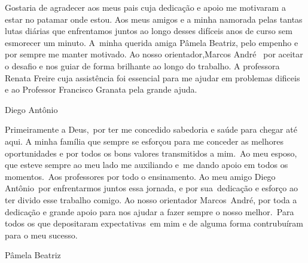 \documentclass[
    12pt,               %
    openright,          %
    oneside,            %
    a4paper,            %
    section=TITLE,     %
    english,            %
    french,             %
    spanish,            %
    brazil              %
    ]{abntex2}
\begin{document}
\hspace{.45\textwidth}
      \begin{minipage}{.5\textwidth}
Gostaria de agradecer aos meus pais cuja dedicação e apoio me motivaram a estar no patamar onde estou. Aos meus amigos e a minha namorada pelas tantas lutas diárias que enfrentamos juntos ao longo desses difíceis anos de curso sem esmorecer um minuto. A~minha querida amiga Pâmela Beatriz, pelo empenho e por sempre me manter motivado. Ao nosso orientador,Marcos André~ por aceitar o desafio e nos guiar de forma brilhante ao longo do trabalho. A professora Renata Freire cuja assistência foi essencial para me ajudar em problemas dificeis e ao Professor Francisco Granata pela grande ajuda.
\end{minipage}


\begin{flushright}
Diego Antônio
\end{flushright}


\hspace{.45\textwidth}
      \begin{minipage}{.5\textwidth}
Primeiramente a Deus,~por ter me concedido sabedoria e saúde para chegar até aqui. A minha família que sempre se esforçou para me conceder as melhores oportunidades e por todos os bons valores transmitidos a mim.~Ao meu esposo, que esteve sempre ao meu lado me auxiliando e~me dando apoio em todos os momentos.~Aos professores por todo o ensinamento. Ao meu amigo Diego Antônio~por enfrentarmos juntos essa jornada, e por sua~dedicação e esforço ao ter divido esse trabalho comigo. Ao nosso orientador Marcos~André, por toda a dedicação e grande apoio para nos ajudar a fazer sempre o nosso melhor.~Para todos os que depositaram expectativas~em mim e de alguma forma contrubuíram para o meu sucesso.
\end{minipage}

\begin{flushright}
Pâmela Beatriz
\end{flushright}

\newpage






\end{document}
